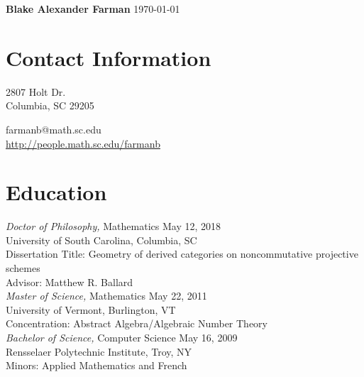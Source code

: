 \documentclass{article}
\begin{document}
\noindent\textbf{\large{Blake Alexander Farman}} \hfill \today\\
\noindent\makebox[\linewidth]{\rule{\textwidth}{0.4pt}}

\section*{Contact Information}
\begin{minipage}{1.3in}
  2807 Holt Dr.\\
  Columbia, SC 29205
\end{minipage}
\hfill
\begin{minipage}{2.15in}
  farmanb@math.sc.edu\\
  \hyperref[http://people.math.sc.edu/farmanb]{http://people.math.sc.edu/farmanb}
\end{minipage}

  
  \section*{Education} 
  \textsl{Doctor of Philosophy,} Mathematics \hfill May 12, 2018\\
  University of South Carolina, Columbia, SC\\
  Dissertation Title: Geometry of derived categories on noncommutative projective schemes\\
  Advisor: Matthew R. Ballard\\
  
  \noindent
  \textsl{Master of Science,} Mathematics \hfill May 22, 2011\\
  University of Vermont, Burlington, VT\\
  Concentration: Abstract Algebra/Algebraic Number Theory\\
  
  \noindent\textsl{Bachelor of Science,} Computer Science \hfill May 16, 2009\\
  Rensselaer Polytechnic Institute, Troy, NY\\
  Minors: Applied Mathematics and French
\end{document}
